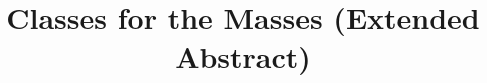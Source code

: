 \documentclass[9pt]{sig-alternate-05-2015}
\begin{document}

%

\title{Classes for the Masses (Extended Abstract)}
%
%
%
%
%
\end{document}
